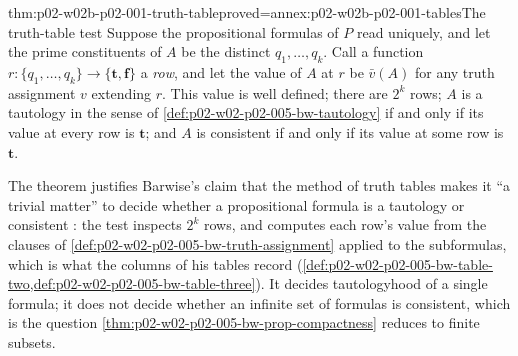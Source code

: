 \begin{hbtheorem}{thm:p02-w02b-p02-001-truth-table}{proved=annex:p02-w02b-p02-001-tables}{The truth-table test}
Suppose the propositional formulas of \(P\) read uniquely, and let the prime
constituents of \(A\) be the distinct \(q_1,\ldots,q_k\).  Call a function
\(r:\{q_1,\ldots,q_k\}\to\{\mathbf t,\mathbf f\}\) a \emph{row}, and let the
value of \(A\) at \(r\) be \(\bar v(A)\) for any truth assignment \(v\)
extending \(r\).  This value is well defined; there are \(2^k\) rows; \(A\)
is a tautology in the sense of \cref{def:p02-w02-p02-005-bw-tautology} if
and only if its value at every row is \(\mathbf t\); and \(A\) is
consistent if and only if its value at some row is \(\mathbf t\).
\end{hbtheorem}

The theorem justifies Barwise's claim that the method of truth tables makes
it ``a trivial matter'' to decide whether a propositional formula is a
tautology or consistent \cite[ch.~A.1, \S4, p.~25]{Barwise1977FirstOrder}:
the test inspects \(2^k\) rows, and computes each row's value from the
clauses of \cref{def:p02-w02-p02-005-bw-truth-assignment} applied to the
subformulas, which is what the columns of his tables record
(\cref{def:p02-w02-p02-005-bw-table-two,def:p02-w02-p02-005-bw-table-three}).
It decides tautologyhood of a single formula; it does not decide whether an
infinite set of formulas is consistent, which is the question
\cref{thm:p02-w02-p02-005-bw-prop-compactness} reduces to finite subsets.


